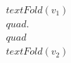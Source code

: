 \documentclass[preview]{standalone}
\begin{document}
\begin{align*}
text{Fold}(v_1)\\quad.\\quad\\text{Fold}(v_2)
\end{align*}
\end{document}
